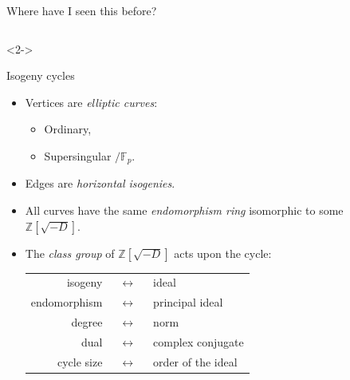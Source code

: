 \documentclass[aspectratio=169]{beamer}
\newcommand{\F}{\mathbb{F}}
\newcommand{\Z}{\mathbb{Z}}
\begin{document}
\begin{frame}{Where have I seen this before?}
  \begin{columns}
    \begin{column}{0.6\textwidth}
      \begin{uncoverenv}<2->
        \begin{block}{Isogeny cycles}
          \begin{itemize}
          \item Vertices are \emph{elliptic curves}:
            \begin{itemize}
            \item Ordinary,
              \hfill{}
            \item Supersingular $/\F_p$.
              \hfill{}
            \end{itemize}
          \item Edges are \emph{horizontal isogenies}.
          \item<3-> All curves have the same \emph{endomorphism ring}
            isomorphic to some $\Z[\sqrt{-D}]$.
          \item<3-> The \emph{class group} of $\Z[\sqrt{-D}]$ acts upon the
            cycle:

            \smallskip
            \begin{tabular}{r c l}
              isogeny & ~$\leftrightarrow$~ & ideal\\
              endomorphism  & ~$\leftrightarrow$~ & principal ideal\\
              degree & ~$\leftrightarrow$~ & norm\\
              dual & ~$\leftrightarrow$~ & complex conjugate\\
              cycle size & ~$\leftrightarrow$~ & order of the ideal
            \end{tabular}
          \end{itemize}
        \end{block}
      \end{uncoverenv}
    \end{column}
    \begin{column}{0.4\textwidth}
      \centering
    \end{column}      
  \end{columns}
\end{frame}
\end{document}

